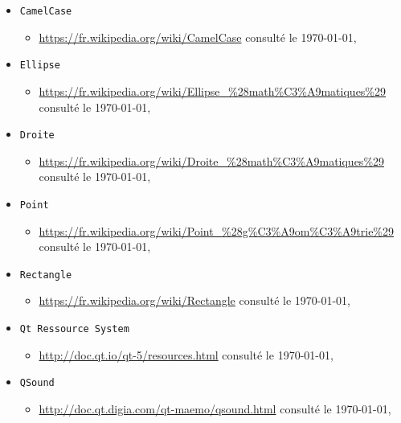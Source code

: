 \documentclass[a4paper,11pt]{report}
\begin{document}
\begin{itemize}
\begin{itemize}
		\end{itemize}
	\item[] \texttt{CamelCase} 
		\begin{itemize}
			\item \url{https://fr.wikipedia.org/wiki/CamelCase} consulté le \today,\\
		\end{itemize}
	\item[] \texttt{Ellipse}
		\begin{itemize}
			\item \url{https://fr.wikipedia.org/wiki/Ellipse_\%28math\%C3\%A9matiques\%29} consulté le \today,\\
		\end{itemize}
	\item[] \texttt{Droite}
		\begin{itemize}
			\item \url{https://fr.wikipedia.org/wiki/Droite_\%28math\%C3\%A9matiques\%29} consulté le \today,\\
		\end{itemize}
	\item[] \texttt{Point}
		\begin{itemize}
			\item \url{https://fr.wikipedia.org/wiki/Point_\%28g\%C3\%A9om\%C3\%A9trie\%29}
				consulté le \today,\\
		\end{itemize}
	\item[] \texttt{Rectangle}
		\begin{itemize}
			\item \url{https://fr.wikipedia.org/wiki/Rectangle} consulté le
				\today, \\
		\end{itemize}
	\item[]  \texttt{Qt Ressource System}
		\begin{itemize}
			\item \url{http://doc.qt.io/qt-5/resources.html} consulté le
				\today,\\
		\end{itemize}
	\item[] \texttt{QSound}
		\begin{itemize}
			\item \url{http://doc.qt.digia.com/qt-maemo/qsound.html} consulté le
				\today,\\
		\end{itemize}
\end{itemize}
\end{document}
